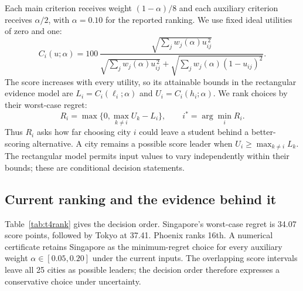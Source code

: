 Each main criterion receives weight $(1-\alpha)/8$ and each auxiliary
criterion receives $\alpha/2$, with $\alpha=0.10$ for the reported ranking.
We use fixed ideal utilities of zero and one:
\begin{equation}
 C_i(u;\alpha)=100\,
 \frac{\sqrt{\sum_j w_j(\alpha)u_{ij}^{\,2}}}
 {\sqrt{\sum_j w_j(\alpha)u_{ij}^{\,2}}+
  \sqrt{\sum_j w_j(\alpha)(1-u_{ij})^2}}.
 \label{eq:t4score}
\end{equation}
The score increases with every utility, so its attainable bounds in the
rectangular evidence model are $L_i=C_i(\ell_i;\alpha)$ and
$U_i=C_i(h_i;\alpha)$. We rank choices by their worst-case regret:
\begin{equation}
 R_i=\max\{0,\max_{k\ne i}U_k-L_i\},\qquad
 i^*=\arg\min_i R_i.
 \label{eq:t4regret}
\end{equation}
Thus $R_i$ asks how far choosing city $i$ could leave a student behind a
better-scoring alternative. A city remains a possible score leader when
$U_i\geq\max_{k\ne i}L_k$. The rectangular model permits input values to vary
independently within their bounds; these are conditional decision statements.

\clearpage
\subsection{Current ranking and the evidence behind it}
Table~\ref{tab:t4rank} gives the decision order. Singapore's worst-case
regret is 34.07 score points, followed by Tokyo at 37.41. Phoenix ranks
16th. A numerical certificate retains Singapore as the minimum-regret
choice for every auxiliary weight $\alpha\in[0.05,0.20]$ under the current
inputs. The overlapping score intervals leave all 25 cities as possible
leaders; the decision order therefore expresses a conservative choice under
uncertainty.

